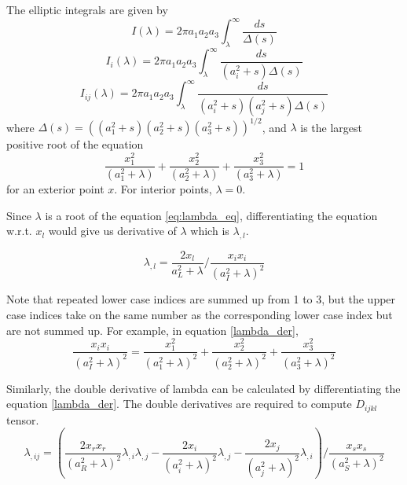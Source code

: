 \documentclass[12pt, a4paper]{report}
\begin{document}
The elliptic integrals are given by 
\begin{equation}
    I(\lambda) = 2\pi a_1 a_2 a_3 \int_{\lambda}^{\infty} \frac{ds}{\Delta (s)}
\end{equation}
\begin{equation}
    I_{i}(\lambda) = 2\pi a_1 a_2 a_3 \int_{\lambda}^{\infty} \frac{ds}{(a_{i}^{2} + s) \Delta (s)}
\end{equation}
\begin{equation}
    I_{ij}(\lambda) = 2\pi a_1 a_2 a_3 \int_{\lambda}^{\infty} \frac{ds}{(a_{i}^{2} + s)(a_{j}^{2} + s) \Delta (s)}
\end{equation}
where $\Delta(s) = ((a_{1}^{2} + s)(a_{2}^{2} + s)(a_{3}^{2} + s))^{1/2}$, and $\lambda$ is the largest positive root of the equation
\begin{equation}
    \frac{x_{1}^{2}}{(a_{1}^{2} + \lambda)} + \frac{x_{2}^{2}}{(a_{2}^{2} + \lambda)} + \frac{x_{3}^{2}}{(a_{3}^{2} + \lambda)} = 1
    \label{eq:lambda_eq}
\end{equation}
for an exterior point $x$. For interior points, $\lambda = 0$.

Since $\lambda$ is a root of the equation \ref{eq:lambda_eq}, differentiating the equation w.r.t. $x_{l}$ would give us derivative of $\lambda$ which is $\lambda_{,l}$.

\begin{equation}
    \lambda_{,l} = \frac{2x_{l}}{a_{L}^{2} + \lambda} / \frac{x_i x_i}{(a_{I}^{2} + \lambda)^2}
    \label{lambda_der}
\end{equation}

Note that repeated lower case indices are summed up from 1 to 3, but the upper case indices take on the same number as the corresponding lower case index but are not summed up. For example, in equation \ref{lambda_der},
\begin{equation}
    \frac{x_i x_i}{(a_{I}^{2} + \lambda)^2} = \frac{x_{1}^{2}}{(a_{1}^{2} + \lambda)^2} + \frac{x_{2}^{2}}{(a_{2}^{2} + \lambda)^2} + \frac{x_{3}^{2}}{(a_{3}^{2} + \lambda)^2}
\end{equation}

Similarly, the double derivative of lambda can be calculated by differentiating the equation \ref{lambda_der}. The double derivatives are required to compute $D_{ijkl}$ tensor.
\begin{equation}
    \lambda_{,ij} = \left({\frac{2 x_r x_r}{(a_{R}^{2} + \lambda)^2} \lambda_{,i} \lambda_{,j} - \frac{2x_i}{(a_{i}^{2} + \lambda)^2} \lambda_{,j} - \frac{2x_j}{(a_{j}^{2} + \lambda)^2} \lambda_{,i}}\right) / \frac{x_s x_s}{(a_{S}^{2} + \lambda)^2}
\end{equation}
\end{document}
